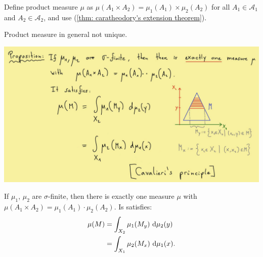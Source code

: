 \documentclass[../../note.tex]{subfiles}
\begin{document}
\begin{definition}
    Define product measure $\mu$ as $\mu(A_1 \times A_2) = \mu_1(A_1) \times \mu_2(A_2)$ for all $A_1 \in \mathcal{A}_1$ and $A_2 \in \mathcal{A}_2$, and use (\ref{thm: caratheodory's extension theorem}).
\end{definition}
\begin{remark}
    Product measure in general not unique.
\end{remark}

\includegraphics[scale=0.30]{../figures/Cavalieri's principle.png}
\begin{proposition}
    \label{thm: cavalieri's principle}
    If $\mu_1$, $\mu_2$ are $\sigma$-finite, then there is exactly one measure $\mu$ with $\mu(A_1 \times A_2)=\mu_1(A_1) \cdot \mu_2(A_2)$. Is satisfies:
    \begin{align}
        \mu(M)
        &= \int_{X_2} \mu_1(M_y)~{\rm d}\mu_2(y) \\
        &= \int_{X_1} \mu_2(M_x)~{\rm d}\mu_1(x).
    \end{align}
\end{proposition}
\end{document}
